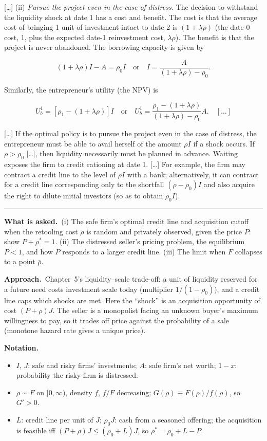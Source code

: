 \documentclass[11pt,a4paper]{article}
\newcommand{\notation}{\par\noindent\textbf{Notation.}}
\newcommand{\asked}{\par\medskip\noindent\textbf{What is asked.}~}
\newcommand{\approach}{\par\smallskip\noindent\textbf{Approach.}~}
\newcommand{\stmtend}{\par\endgroup\nopagebreak\noindent\rule{\linewidth}{0.4pt}\par\medskip}
\begin{document}
{[}\ldots{]} (ii) \emph{Pursue the project even in the case of distress.} The decision to withstand
the liquidity shock at date 1 has a cost and benefit. The cost is that the average cost of bringing
1 unit of investment intact to date 2 is \((1 + \lambda\rho)\) (the date-0 cost, 1, plus the
expected date-1 reinvestment cost, \(\lambda\rho\)). The benefit is that the project is never
abandoned. The borrowing capacity is given by

\[(1 + \lambda\rho)I - A = \rho_0 I \quad\text{or}\quad I = \frac{A}{(1 + \lambda\rho) - \rho_0}.\]

Similarly, the entrepreneur's utility (the NPV) is

\[U_b^1 = [\rho_1 - (1 + \lambda\rho)]I \quad\text{or}\quad U_b^1 = \frac{\rho_1 - (1 + \lambda\rho)}{(1 + \lambda\rho) - \rho_0}A. \quad […]\]

{[}\ldots{]} If the optimal policy is to pursue the project even in the case of distress, the
entrepreneur must be able to avail herself of the amount \(\rho I\) if a shock occurs. If
\(\rho > \rho_0\) {[}\ldots{]}, then liquidity necessarily must be planned in advance. Waiting
exposes the firm to credit rationing at date 1. {[}\ldots{]} For example, the firm may contract a
credit line to the level of \(\rho I\) with a bank; alternatively, it can contract for a credit line
corresponding only to the shortfall \((\rho - \rho_0)I\) and also acquire the right to dilute
initial investors (so as to obtain \(\rho_0 I\)).
\stmtend

\asked (i) The safe firm's optimal credit line and acquisition cutoff when the retooling cost $\rho$ is
random and privately observed, given the price $P$: show $P+\rho^*=1$. (ii) The distressed seller's
pricing problem, the equilibrium $P<1$, and how $P$ responds to a larger credit line. (iii) The limit
when $F$ collapses to a point $\bar\rho$.

\approach Chapter~5's liquidity--scale trade-off: a unit of liquidity reserved for a future need costs
investment scale today (multiplier $1/(1-\rho_0)$), and a credit line caps which shocks are met. Here the
``shock'' is an acquisition opportunity of cost $(P+\rho)J$. The seller is a monopolist facing an
unknown buyer's maximum willingness to pay, so it trades off price against the probability of a sale
(monotone hazard rate gives a unique price).

\notation
\begin{itemize}
  \item $I$, $J$: safe and risky firms' investments; $A$: safe firm's net worth; $1-x$: probability the risky firm is distressed.
  \item $\rho\sim F$ on $[0,\infty)$, density $f$, $f/F$ decreasing; $G(\rho)\equiv F(\rho)/f(\rho)$, so $G'>0$.
  \item $L$: credit line per unit of $J$; $\rho_0J$: cash from a seasoned offering; the acquisition is feasible iff $(P+\rho)J\le(\rho_0+L)J$, so $\rho^*=\rho_0+L-P$.
\end{itemize}
\end{document}

